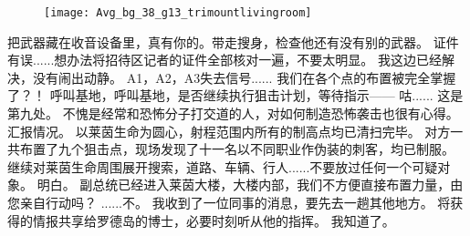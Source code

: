 \documentclass[openany]{book}
\begin{document}
\begin{figure}[h]
    \centering
    \texttt{[image: Avg\_bg\_38\_g13\_trimountlivingroom]}
\end{figure}
\begin{dialogue}
     把武器藏在收音设备里，真有你的。带走搜身，检查他还有没有别的武器。
     证件有误......想办法将招待区记者的证件全部核对一遍，不要太明显。
     我这边已经解决，没有闹出动静。
     A1，A2，A3失去信号......
     我们在各个点的布置被完全掌握了？！
     呼叫基地，呼叫基地，是否继续执行狙击计划，等待指示——
     咕......
     这是第九处。
     不愧是经常和恐怖分子打交道的人，对如何制造恐怖袭击也很有心得。
     汇报情况。
     以莱茵生命为圆心，射程范围内所有的制高点均已清扫完毕。
     对方一共布置了九个狙击点，现场发现了十一名以不同职业作伪装的刺客，均已制服。
     继续对莱茵生命周围展开搜索，道路、车辆、行人......不要放过任何一个可疑对象。
     明白。
     副总统已经进入莱茵大楼，大楼内部，我们不方便直接布置力量，由您亲自行动吗？
     ......不。
     我收到了一位同事的消息，要先去一趟其他地方。
     将获得的情报共享给罗德岛的博士，必要时刻听从他的指挥。
     我知道了。
\end{dialogue}
\end{document}
